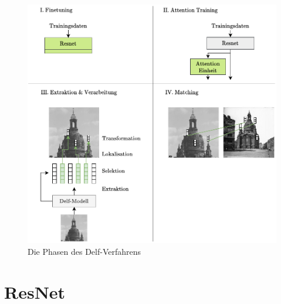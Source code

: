 \begin{figure}[H]

\includegraphics[scale=1.0]{delf_stages.pdf}
\caption{Die Phasen des Delf-Verfahrens}
\label{delf_stages}
\end{figure}

\section{ResNet}

